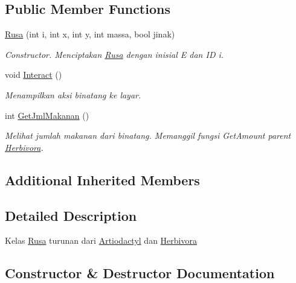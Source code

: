 \subsection*{Public Member Functions}
\begin{DoxyCompactItemize}
\item 
\hyperlink{classRusa_ab2f3ddf21f8ed4b031f7811b46e9e060}{Rusa} (int i, int x, int y, int massa, bool jinak)
\begin{DoxyCompactList}\small\item\em Constructor. Menciptakan \hyperlink{classRusa}{Rusa} dengan inisial \textquotesingle{}E\textquotesingle{} dan ID i. \end{DoxyCompactList}\item 
void \hyperlink{classRusa_a797c0954b9422e5c13e8c5574d922776}{Interact} ()\hypertarget{classRusa_a797c0954b9422e5c13e8c5574d922776}{}\label{classRusa_a797c0954b9422e5c13e8c5574d922776}

\begin{DoxyCompactList}\small\item\em Menampilkan aksi binatang ke layar. \end{DoxyCompactList}\item 
int \hyperlink{classRusa_aafe45dbc124b4639bee4d625a7461d1b}{Get\+Jml\+Makanan} ()
\begin{DoxyCompactList}\small\item\em Melihat jumlah makanan dari binatang. Memanggil fungsi Get\+Amount parent \hyperlink{classHerbivora}{Herbivora}. \end{DoxyCompactList}\end{DoxyCompactItemize}
\subsection*{Additional Inherited Members}


\subsection{Detailed Description}
Kelas \hyperlink{classRusa}{Rusa} turunan dari \hyperlink{classArtiodactyl}{Artiodactyl} dan \hyperlink{classHerbivora}{Herbivora} 

\subsection{Constructor \& Destructor Documentation}
